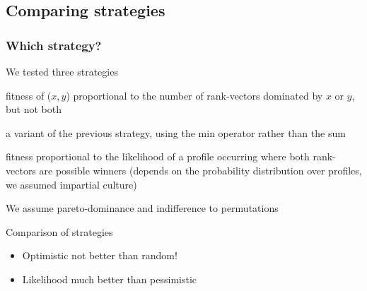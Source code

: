 \documentclass[english]{beamer}
\begin{document}
\subsection{Comparing strategies}
\begin{frame}
	\frametitle{Which strategy?}
	
	We tested three strategies
	\begin{description}[pessimistic]
		\item[optimistic] fitness of ($x, y$) proportional to the number of rank-vectors dominated by $x$ or $y$, but not both
		\item[pessimistic] a variant of the previous strategy, using the min operator rather than the sum
		\item[likelihood] fitness proportional to the likelihood of a profile occurring where both rank-vectors are possible winners {\tiny (depends on the probability distribution over profiles, we assumed impartial culture)}
	\end{description}
	We assume pareto-dominance and indifference to permutations
	\begin{block}{Comparison of strategies}
		\begin{itemize}
			\item Optimistic not better than random!
			\item Likelihood much better than pessimistic
		\end{itemize}
	\end{block}
\end{frame}
\end{document}
